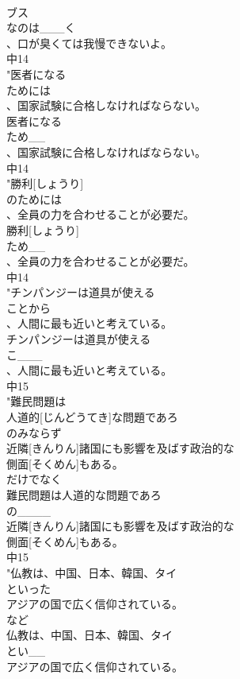 \documentclass[8pt]{extreport}
\begin{document}
\begin{CJK}{UTF8}{min}
\\	ブス
\\	なのは___く
\\	、口が臭くては我慢できないよ。
\\	中14
\\	"医者になる
\\	ためには
\\	、国家試験に合格しなければならない。
\\	医者になる
\\	ため__
\\	、国家試験に合格しなければならない。
\\	中14
\\	"勝利[しょうり]
\\	のためには
\\	、全員の力を合わせることが必要だ。
\\	勝利[しょうり]
\\	ため__
\\	、全員の力を合わせることが必要だ。
\\	中14
\\	"チンパンジーは道具が使える
\\	ことから
\\	、人間に最も近いと考えている。
\\	チンパンジーは道具が使える
\\	こ___
\\	、人間に最も近いと考えている。
\\	中15
\\	"難民問題は
\\	人道的[じんどうてき]な問題であろ
\\	のみならず
\\	近隣[きんりん]諸国にも影響を及ばす政治的な
\\	側面[そくめん]もある。
\\	だけでなく 
\\	難民問題は人道的な問題であろ
\\	の____
\\	近隣[きんりん]諸国にも影響を及ばす政治的な
\\	側面[そくめん]もある。
\\	中15
\\	"仏教は、中国、日本、韓国、タイ
\\	といった
\\	アジアの国で広く信仰されている。
\\	など 
\\	仏教は、中国、日本、韓国、タイ
\\	とい__
\\	アジアの国で広く信仰されている。

\end{CJK}
\end{document}
